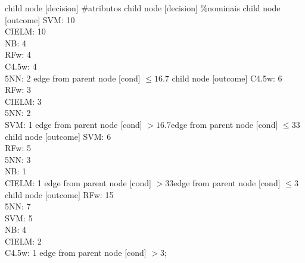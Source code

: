 child {node [decision] {\#atributos}
child {node [decision] {\%nominais}
child {node [outcome] {
SVM: 10\\
CIELM: 10\\
NB: 4\\
RFw: 4\\
C4.5w: 4\\
5NN: 2} edge from parent node [cond] {$\leq16.7$}}
child {node [outcome] {
C4.5w: 6\\
RFw: 3\\
CIELM: 3\\
5NN: 2\\
SVM: 1} edge from parent node [cond] {$>16.7$}}edge from parent node [cond] {$\leq33$}}
child {node [outcome] {
SVM: 6\\
RFw: 5\\
5NN: 3\\
NB: 1\\
CIELM: 1} edge from parent node [cond] {$>33$}}edge from parent node [cond] {$\leq3$}}
child {node [outcome] {
RFw: 15\\
5NN: 7\\
SVM: 5\\
NB: 4\\
CIELM: 2\\
C4.5w: 1} edge from parent node [cond] {$>3$}};